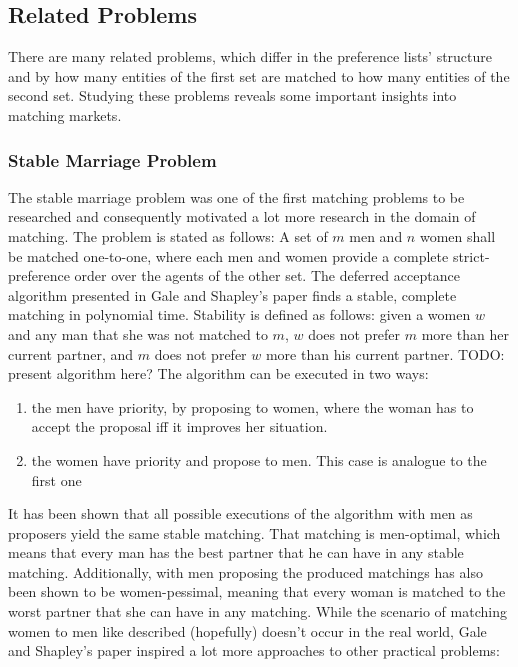 \subsection{Related Problems}
There are many related problems, which differ in the preference lists' structure and by how many entities of the first set are matched to how many entities of the second set. Studying these problems reveals some important insights into matching markets.

\subsubsection{Stable Marriage Problem}
The stable marriage problem was one of the first matching problems to be researched\cite{GaleShapleyOrig} and consequently motivated a lot more research in the domain of matching.
\newline
The problem is stated as follows: A set of $m$ men and $n$ women shall be matched one-to-one, where each men and women provide a complete strict-preference order over the agents of the other set. The deferred acceptance algorithm presented in Gale and Shapley's paper\cite{GaleShapleyOrig}
finds a stable, complete matching in polynomial time. Stability is defined as follows: given a women $w$ and any man that she was not matched to $m$, $w$ does not prefer $m$ more than her current partner, and $m$ does not prefer $w$ more than his current partner. 
\newline
TODO: present algorithm here?
\newline
The algorithm can be executed in two ways: 
\begin{enumerate}
    \item the men have priority, by proposing to women, where the woman has to accept the proposal iff it improves her situation.  
    \item the women have priority and propose to men. This case is analogue to the first one
\end{enumerate}
It has been shown that all possible executions of the algorithm with men as proposers yield the same stable matching. That matching is men-optimal, which means that every man has the best partner that he can have in any stable matching.\cite{Gusfield} Additionally, with men proposing the produced matchings has also been shown to be women-pessimal, meaning that every woman is matched to the worst partner that she can have in any matching.\cite{Gusfield}
\newline
While the scenario of matching women to men like described (hopefully) doesn't occur in the real world, Gale and Shapley's paper inspired a lot more approaches to other practical problems:

